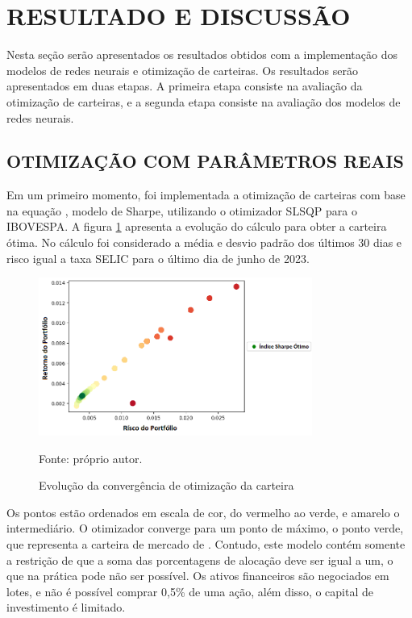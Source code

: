 \section{RESULTADO E DISCUSSÃO}

    \ipar Nesta seção serão apresentados os resultados obtidos com a implementação dos modelos de redes neurais e otimização de carteiras. Os resultados serão apresentados em duas etapas. A primeira etapa consiste na avaliação da otimização de carteiras, e a segunda etapa consiste na avaliação dos modelos de redes neurais.

    \subsection{OTIMIZAÇÃO COM PARÂMETROS REAIS}

        \ipar Em um primeiro momento, foi implementada a otimização de carteiras com base na equação , modelo de Sharpe, utilizando o otimizador \acrshort{SLSQP} para o \acrshort{IBOVESPA}. A figura \ref{fig:otimizacao_ibov} apresenta a evolução do cálculo para obter a carteira ótima. No cálculo foi considerado a média e desvio padrão dos últimos 30 dias e risco igual a taxa SELIC para o último dia de junho de 2023.

        \begin{figure}[H]
            \centering
            \caption{Evolução da convergência de otimização da carteira}
            \label{fig:otimizacao_ibov}
            \includegraphics[width=0.8\textwidth]{./imagens/otimizacao_ibov.png}
            \par \footnotesize Fonte: próprio autor.
        \end{figure}

        \ipar Os pontos estão ordenados em escala de cor, do vermelho ao verde, e amarelo o intermediário. O otimizador converge para um ponto de máximo, o ponto verde, que representa a carteira de mercado de . Contudo, este modelo contém somente a restrição de que a soma das porcentagens de alocação deve ser igual a um, o que na prática pode não ser possível. Os ativos financeiros são negociados em lotes, e não é possível comprar 0,5\% de uma ação, além disso, o capital de investimento é limitado. 

